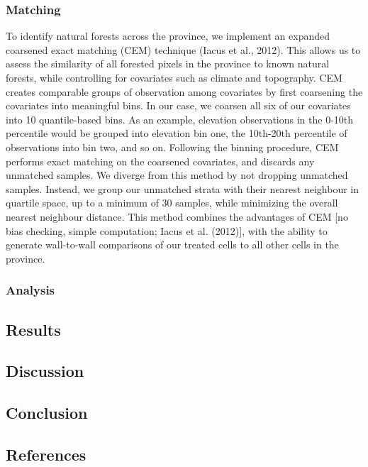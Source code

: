 \documentclass[
]{agujournal2019}
\begin{document}
\subsubsection{Matching}\label{sec-matching}

To identify natural forests across the province, we implement an
expanded coarsened exact matching (CEM) technique (Iacus et al., 2012).
This allows us to assess the similarity of all forested pixels in the
province to known natural forests, while controlling for covariates such
as climate and topography. CEM creates comparable groups of observation
among covariates by first coarsening the covariates into meaningful
bins. In our case, we coarsen all six of our covariates into 10
quantile-based bins. As an example, elevation observations in the 0-10th
percentile would be grouped into elevation bin one, the 10th-20th
percentile of observations into bin two, and so on. Following the
binning procedure, CEM performs exact matching on the coarsened
covariates, and discards any unmatched samples. We diverge from this
method by not dropping unmatched samples. Instead, we group our
unmatched strata with their nearest neighbour in quartile space, up to a
minimum of 30 samples, while minimizing the overall nearest neighbour
distance. This method combines the advantages of CEM {[}no bias
checking, simple computation; Iacus et al. (2012){]}, with the ability
to generate wall-to-wall comparisons of our treated cells to all other
cells in the province.

\subsubsection{Analysis}\label{analysis}

\subsection{Results}\label{results}

\subsection{Discussion}\label{discussion}

\subsection{Conclusion}\label{conclusion}

\subsection*{References}\label{references}
\end{document}
